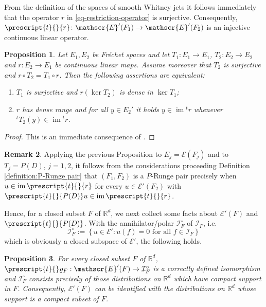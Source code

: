\documentclass[10pt,leqno]{amsart}
\newtheorem{prop}{Proposition}%
\theoremstyle{definition}
\newtheorem{remark}[prop]{Remark}
\newcommand{\R}{\mathbb R}
\newcommand{\cI}{\mathcal I}
\newcommand{\im}{\operatorname{im}}
\let\rho\varrho
\begin{document}
From the definition of the spaces of smooth Whitney jets it follows immediately that the operator $r$ in \eqref{eq-restriction-operator} is surjective. Consequently,
$\prescript{t}{}{r}\colon \mathscr{E}'(F_1)\to \mathscr{E}'(F_2)$
is an injective continuous linear operator.

\begin{prop}\label{abstract-criterion}
	Let $E_1,E_2$ be Fr\'echet spaces and let $T_1\colon E_1\to E_1$, $T_2\colon E_2\to E_2$ and $r\colon E_2\to E_1$ be continuous linear maps. Assume moreover that $T_2$ is surjective and $r\circ T_2=T_1\circ r$. Then the following assertions are equivalent:
	\begin{enumerate}[{\upshape(i)}]
		\item $T_1$ is surjective and $r(\ker T_2)$ is dense in $\ker T_1$;
		\item $r$ has dense range and for all $y\in E_2'$ it holds $y\in\im{}^t r$ whenever ${}^tT_2(y)\in\im{}^t r$.
	\end{enumerate}
\end{prop}

\begin{proof}
	This is an immediate consequence of \cite[Proposition 13.1 and Corollary 3 on p.~54]{Treves-LCS-PDE}. 
\end{proof}

\begin{remark}\label{remark:motivation}
	Applying the previous Proposition to $E_j=\mathscr{E}(F_j)$ and to $T_j=P(D)$, $j=1,2$, it follows from the considerations proceeding Definition \ref{definition:P-Runge pair} that $(F_1, F_2)$ is a $P$-Runge pair precisely when $u\in\im\prescript{t}{}{r}$ for every $u\in\mathscr{E}'(F_2)$ with $\prescript{t}{}{P(D)}u\in\im\prescript{t}{}{r}$.
	
	Hence, for a closed subset $F$ of $\R^d$, we next collect some facts about $\mathscr{E}'(F)$ and $\prescript{t}{}{P(D)}$. With the annihilator/polar $\cI_F^\circ$ of $\cI_F$, i.e.
	$$\cI_F^\circ:=\left\{u\in\mathscr{E}'\colon u(f)=0 \text{  for all } f\in\cI_F\right\}$$
	which is obviously a closed subspace of $\mathscr{E}'$, the following holds.
\end{remark}

\begin{prop}\label{prop-IFperp}
	For every closed subset $F$ of $\R^d$, $\prescript{t}{}\rho_F:\mathscr{E}'(F)\to\cI_F^\circ$
	is a correctly defined isomorphism and $\cI_F^\circ$ consists precisely of those distributions on $\R^d$ which have compact support in $F$. Consequently, $\mathscr{E}'(F)$ can be identified with the distributions on $\R^d$ whose support is a compact subset of $F$. 
\end{prop}
\end{document}
